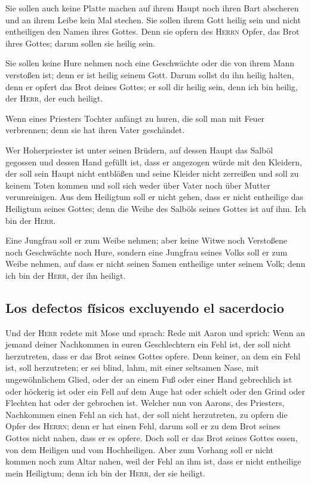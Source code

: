  Sie sollen auch keine Platte machen auf ihrem Haupt noch
ihren Bart abscheren und an ihrem Leibe kein Mal stechen. 
Sie sollen ihrem Gott heilig sein und nicht entheiligen den Namen ihres
Gottes. Denn sie opfern des \textsc{Herrn} Opfer, das Brot ihres Gottes;
darum sollen sie heilig sein.

 Sie sollen keine Hure nehmen noch eine Geschwächte oder
die von ihrem Mann verstoßen ist; denn er ist heilig seinem Gott.
 Darum sollst du ihn heilig halten, denn er opfert das
Brot deines Gottes; er soll dir heilig sein, denn ich bin heilig, der
\textsc{Herr}, der euch heiligt.

 Wenn eines Priesters Tochter anfängt zu huren, die soll
man mit Feuer verbrennen; denn sie hat ihren Vater geschändet.

 Wer Hoherpriester ist unter seinen Brüdern, auf dessen
Haupt das Salböl gegossen und dessen Hand gefüllt ist, dass er angezogen
würde mit den Kleidern, der soll sein Haupt nicht entblößen und seine
Kleider nicht zerreißen  und soll zu keinem Toten kommen
und soll sich weder über Vater noch über Mutter verunreinigen.
 Aus dem Heiligtum soll er nicht gehen, dass er nicht
entheilige das Heiligtum seines Gottes; denn die Weihe des Salböls
seines Gottes ist auf ihm. Ich bin der \textsc{Herr}.

 Eine Jungfrau soll er zum Weibe nehmen; 
aber keine Witwe noch Verstoßene noch Geschwächte noch Hure, sondern
eine Jungfrau seines Volks soll er zum Weibe nehmen,  auf
dass er nicht seinen Samen entheilige unter seinem Volk; denn ich bin
der \textsc{Herr}, der ihn heiligt.

\hypertarget{los-defectos-fuxedsicos-excluyendo-el-sacerdocio}{%
\subsection{Los defectos físicos excluyendo el
sacerdocio}\label{los-defectos-fuxedsicos-excluyendo-el-sacerdocio}}

 Und der \textsc{Herr} redete mit Mose und sprach:
 Rede mit Aaron und sprich: Wenn an jemand deiner
Nachkommen in euren Geschlechtern ein Fehl ist, der soll nicht
herzutreten, dass er das Brot seines Gottes opfere.  Denn
keiner, an dem ein Fehl ist, soll herzutreten; er sei blind, lahm, mit
einer seltsamen Nase, mit ungewöhnlichem Glied,  oder der
an einem Fuß oder einer Hand gebrechlich ist  oder
höckerig ist oder ein Fell auf dem Auge hat oder schielt oder den Grind
oder Flechten hat oder der gebrochen ist.  Welcher nun
von Aarons, des Priesters, Nachkommen einen Fehl an sich hat, der soll
nicht herzutreten, zu opfern die Opfer des \textsc{Herrn}; denn er hat
einen Fehl, darum soll er zu dem Brot seines Gottes nicht nahen, dass er
es opfere.  Doch soll er das Brot seines Gottes essen,
von dem Heiligen und vom Hochheiligen.  Aber zum Vorhang
soll er nicht kommen noch zum Altar nahen, weil der Fehl an ihm ist,
dass er nicht entheilige mein Heiligtum; denn ich bin der \textsc{Herr},
der sie heiligt.


